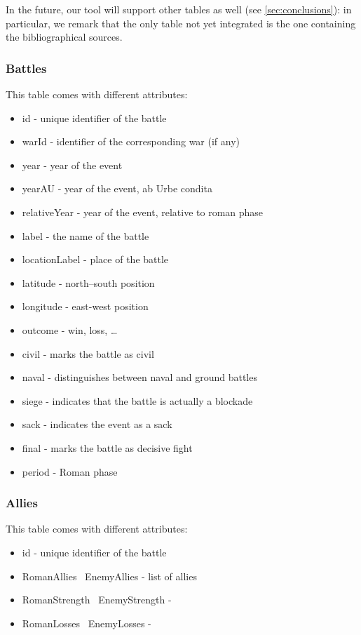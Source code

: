 In the future, our tool will support other tables as well (see \ref{sec:conclusions}): in particular, we remark that the only table not yet integrated is the one containing the bibliographical sources.

\subsubsection{Battles}
This table comes with different attributes:
\begin{itemize}
    \item id - unique identifier of the battle
    \item warId - identifier of the corresponding war (if any)
    \item year - year of the event
    \item yearAU - year of the event, ab Urbe condita
    \item relativeYear - year of the event, relative to roman phase
    \item label - the name of the battle
    \item locationLabel - place of the battle
    \item latitude - north–south position
    \item longitude - east-west position
    \item outcome - win, loss, \dots
    \item civil - marks the battle as civil
    \item naval - distinguishes between naval and ground battles
    \item siege - indicates that the battle is actually a blockade
    \item sack - indicates the event as a sack
    \item final - marks the battle as decisive fight
    \item period - Roman phase
\end{itemize}

\subsubsection{Allies}
This table comes with different attributes:
\begin{itemize}
    \item id - unique identifier of the battle
    \item RomanAllies \ EnemyAllies - list of allies
    \item RomanStrength \ EnemyStrength -
    \item RomanLosses \ EnemyLosses -
\end{itemize}

